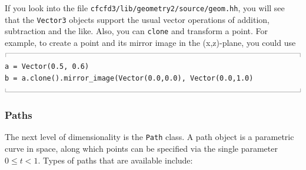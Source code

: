\documentclass[12pt,a4paper,twoside]{article}
\newcommand{\topbar}{\ensuremath{
    \rule{0.1mm}{2.0mm} \rule[2.0mm]{159.5mm}{0.1mm} \rule{0.1mm}{2.0mm}
}}
\newcommand{\bottombar}{\ensuremath{
    \rule{0.1mm}{2.0mm} \rule{159.5mm}{0.1mm} \rule{0.1mm}{2.0mm}
}}
\begin{document}
\medskip
If you look into the file \texttt{cfcfd3/lib/geometry2/source/geom.hh}, you will see that
the \texttt{Vector3} objects support the usual vector operations of addition, subtraction and the like.
Also, you can \texttt{clone} and transform a point.
For example, to create a point and its mirror image in the (x,z)-plane, you could use\\
\topbar\\
\texttt{a = Vector(0.5, 0.6)}\\
\texttt{b = a.clone().mirror\_image(Vector(0.0,0.0), Vector(0.0,1.0)}\\
\bottombar\\
 
\subsubsection{Paths}
%
The next level of dimensionality is the \texttt{Path} class.
A path object is a parametric curve in space, 
along which points can be specified via the single parameter $0 \le t < 1$.
Types of paths that are available include:
\end{document}
